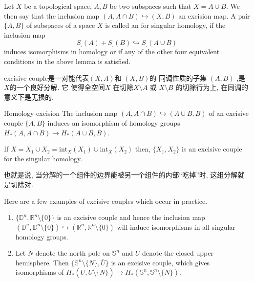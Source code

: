\documentclass[../main.tex]{subfiles}
\begin{document}
\begin{definition}{}{}
Let $X$ be a topological space, $A, B$ be two subspaces such that $X = A \cup B$. We then say that the inclusion map $(A, A \cap B) \hookrightarrow (X, B)$ an excision map. A pair $\{A, B\}$ of subspaces of a space $X$ is called an  for singular homology, if the inclusion map
$$ S_.(A) + S_.(B) \hookrightarrow S_.(A \cup B) $$
induces isomorphisms in homology or if any of the other four equivalent conditions in the above lemma is satisfied.
\end{definition}
\begin{note}
    excisive couple是一对能代表\(  \left( X,A \right)   \)和 \(  \left( X,B \right)   \)的  同调性质的子集 \(  \left( A,B \right)   \) ,是 \(  X  \)的一个良好分解.  它 使得全空间\(  X  \) 在切除\(  X\setminus A  \) 或 \(  X\setminus B  \) 的切除行为上, 在同调的意义下是无损的.
\end{note}

\begin{theorem}{Homology excision}{}
The inclusion map $(A, A \cap B) \hookrightarrow (A \cup B, B)$ of an excisive couple $\{A, B\}$ induces an isomorphism of homology groups $H_*(A, A \cap B) \to H_*(A \cup B, B)$.
\end{theorem}

\begin{theorem}{}{}
If $X = X_1 \cup X_2 = \text{int}_X(X_1) \cup \text{int}_X(X_2)$ then, $\{X_1, X_2\}$ is an excisive couple for the singular homology.
\end{theorem}
\begin{note}
    也就是说, 当分解的一个组件的边界能被另一个组件的内部“吃掉”时, 这组分解就是切除对. 
\end{note}
\begin{example}{}{}
Here are a few examples of excisive couples which occur in practice.
\begin{enumerate}
\item $\{\mathbb{D}^n, \mathbb{R}^n \setminus \{0\}\}$ is an excisive couple and hence the inclusion map $(\mathbb{D}^n, \mathbb{D}^n \setminus \{0\}) \hookrightarrow (\mathbb{R}^n, \mathbb{R}^n \setminus \{0\})$ will induce isomorphisms in all singular homology groups.
\item Let $N$ denote the north pole on $\mathbb{S}^n$ and $\bar{U}$ denote the closed upper hemisphere. Then $\{\mathbb{S}^n \setminus \{N\}, \bar{U}\}$ is an excisive couple, which gives isomorphisms of $H_*(\bar{U}, \bar{U} \setminus \{N\}) \to H_*(\mathbb{S}^n, \mathbb{S}^n \setminus \{N\})$.
\end{enumerate}
\end{example}
\end{document}

